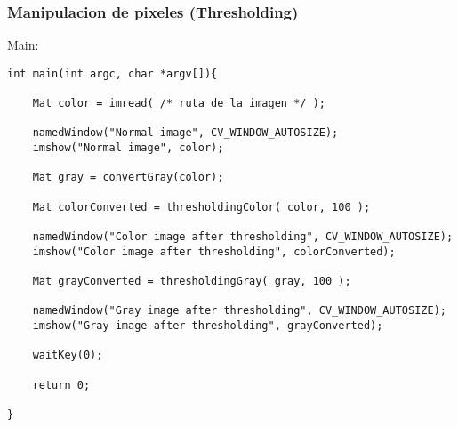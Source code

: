 \begin{frame}[fragile]
   \frametitle{Manipulacion de pixeles (Thresholding)}

   Main:

    \tiny

    \begin{lstlisting}
int main(int argc, char *argv[]){

    Mat color = imread( /* ruta de la imagen */ );

    namedWindow("Normal image", CV_WINDOW_AUTOSIZE);
    imshow("Normal image", color);

    Mat gray = convertGray(color);

    Mat colorConverted = thresholdingColor( color, 100 );

    namedWindow("Color image after thresholding", CV_WINDOW_AUTOSIZE);
    imshow("Color image after thresholding", colorConverted);

    Mat grayConverted = thresholdingGray( gray, 100 );

    namedWindow("Gray image after thresholding", CV_WINDOW_AUTOSIZE);
    imshow("Gray image after thresholding", grayConverted);

    waitKey(0);

    return 0;

}
    \end{lstlisting}

\end{frame}
